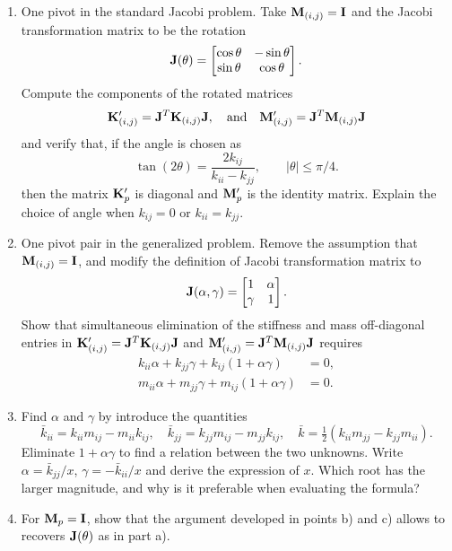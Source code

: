 \documentclass[12pt]{article}
\begin{document}
\begin{enumerate}
  \item[a)] One pivot in the standard Jacobi problem. Take $\mathbf{M}_{(i,j)}=\mathbf{I}$ and the Jacobi transformation matrix to be the rotation
        \[
          \mathbf{J}(\theta)=
          \begin{bmatrix}\cos\theta&-\sin\theta\\ \sin\theta&\cos\theta\end{bmatrix}.
        \]
        Compute the components of the rotated matrices
        $$\mathbf{K}_{(i,j)}'=\mathbf{J}^{T}\mathbf{K}_{(i,j)}\mathbf{J},\quad\mbox{and}\quad  \mathbf{M}_{(i,j)}'=\mathbf{J}^{T}\mathbf{M}_{(i,j)}\mathbf{J}$$
        and verify that, if the angle is chosen as
        \[
          \tan(2\theta)=\frac{2k_{ij}}{k_{ii}-k_{jj}},\qquad |\theta|\leq\pi/4 .
        \]
        then the matrix $\mathbf{K}_p'$ is diagonal and $\mathbf{M}_p'$ is the identity matrix. Explain the choice of angle when $k_{ij}=0$ or $k_{ii}=k_{jj}$.
  \item[b)] One pivot pair in the generalized problem. Remove the assumption that $\mathbf{M}_{(i,j)}=\mathbf{I}$, and modify the definition of Jacobi transformation matrix to
        $$\mathbf{J}(\alpha,\gamma)=\begin{bmatrix}1&\alpha\\\gamma&1\end{bmatrix}.$$
        Show that simultaneous elimination of the stiffness and mass off-diagonal entries in $\mathbf{K}_{(i,j)}'=\mathbf{J}^{T}\mathbf{K}_{(i,j)}\mathbf{J}$ and $\mathbf{M}_{(i,j)}'=\mathbf{J}^{T}\mathbf{M}_{(i,j)}\mathbf{J}$ requires
        \begin{align*}
          k_{ii}\alpha+k_{jj}\gamma+k_{ij}(1+\alpha\gamma) & =0, \\
          m_{ii}\alpha+m_{jj}\gamma+m_{ij}(1+\alpha\gamma) & =0.
        \end{align*}
  \item[c)] Find $\alpha$ and $\gamma$ by introduce the quantities
        \[
          \bar k_{ii}=k_{ii}m_{ij}-m_{ii}k_{ij},\quad
          \bar k_{jj}=k_{jj}m_{ij}-m_{jj}k_{ij},\quad
          \bar k=\tfrac12(k_{ii}m_{jj}-k_{jj}m_{ii}).
        \]
        Eliminate $1+\alpha\gamma$ to find a relation between the two unknowns.
        Write $\alpha=\bar k_{jj}/x$, $\gamma=-\bar k_{ii}/x$ and derive the
        expression of $x$. Which root has the larger magnitude, and why
        is it preferable when evaluating the formula?
  \item[d)] For $\mathbf{M}_p=\mathbf{I}$, show that the argument developed in points b) and c) allows to recovers $\mathbf{J}(\theta)$ as in part a).
\end{enumerate}
\end{document}
